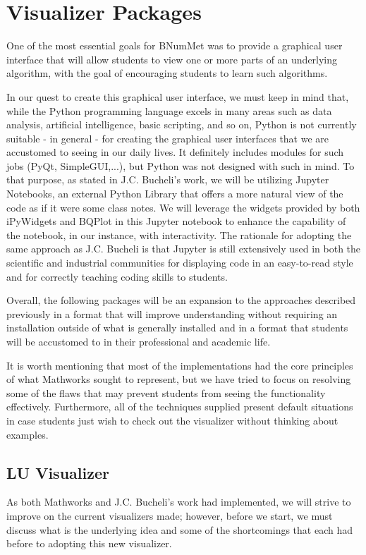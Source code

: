 \section{Visualizer Packages}
One of the most essential goals for BNumMet was to provide a graphical user interface that will allow students to view one or more parts of an underlying algorithm, with the goal of encouraging students to learn such algorithms.

In our quest to create this graphical user interface, we must keep in mind that, while the Python programming language excels in many areas such as data analysis, artificial intelligence, basic scripting, and so on, Python is not currently suitable - in general - for creating the graphical user interfaces that we are accustomed to seeing in our daily lives. It definitely includes modules for such jobs (PyQt, SimpleGUI,...), but Python was not designed with such in mind. To that purpose, as stated in J.C. Bucheli's work, we will be utilizing Jupyter Notebooks, an external Python Library that offers a more natural view of the code as if it were some class notes. We will leverage the widgets provided by both iPyWidgets and BQPlot in this Jupyter notebook to enhance the capability of the notebook, in our instance, with  interactivity.  The rationale for adopting the same approach as J.C. Bucheli is that Jupyter is still extensively used in both the scientific and industrial communities for displaying code in an easy-to-read style and for correctly teaching coding skills to students.

Overall, the following packages will be an expansion to the approaches described previously in a format that will improve understanding without requiring an installation outside of what is generally installed and in a format that students will be accustomed to in their professional and academic life.

It is worth mentioning that most of the implementations had the core principles of what Mathworks sought to represent, but we have tried to focus on resolving some of the flaws that may prevent students from seeing the functionality effectively. Furthermore, all of the techniques supplied present default situations in case students just wish to check out the visualizer without thinking about examples.

\subsection{LU Visualizer}
As both Mathworks and J.C. Bucheli's work had implemented, we will strive to improve on the current visualizers made; however, before we start, we must discuss what is the underlying idea and some of the shortcomings that each had before to adopting this new visualizer.

